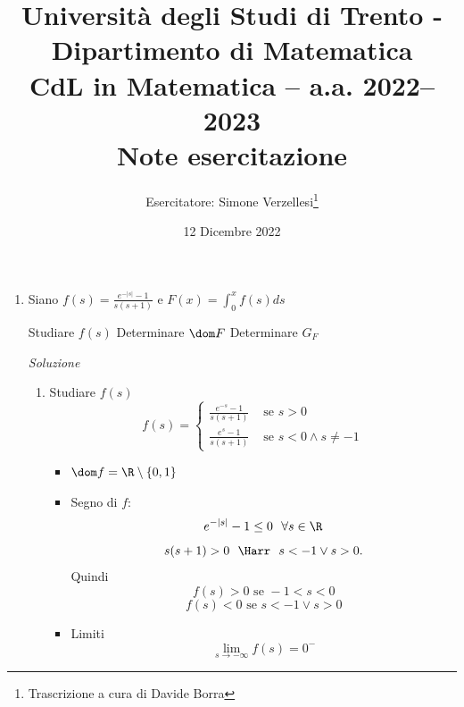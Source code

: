 \documentclass{article}
\title{Università degli Studi di Trento - Dipartimento di Matematica\\
CdL in Matematica – a.a. 2022–2023\\ Note esercitazione}
\author{Esercitatore: Simone Verzellesi\thanks{Trascrizione a cura di Davide Borra}}
\date{12 Dicembre 2022}
\newcommand{\se}{\text{ se }}
\begin{document}
\maketitle
{}
\setlength{\headheight}{30pt}
\begin{enumerate}[label=\textbf{Esercizio 12.\arabic*.},itemindent=*]
\item Siano $f(s)=\frac{e^{-|s|}-1}{s(s+1)}$ e $F(x)=\int_0^xf(s)ds$
\begin{tasks}
    \task Studiare $f(s)$
    \task Determinare $\dom F$
    \task Determinare $G_F$
\end{tasks}
\item[\textit{\large Soluzione~}]~
\begin{enumerate}
    \item Studiare $f(s)$
    \[f(s) = \begin{cases} \frac{e^{ - s} - 1}{s(s + 1)} &\se s > 0\\ \frac{e^{s} - 1}{s(s + 1)} &\se s < 0 \land s\neq - 1\end{cases} \]
    \begin{itemize}
        \item $\dom f=\R\setminus\{0,1\}$
        \item Segno di $f$:
        \[e^{-|s|}-1\leq 0~~\forall s\in \R\]
        \[s(s+1)>0~~\Harr~~s<-1\lor s>0.\]
        Quindi
        \[f(s)>0 \se -1<s<0\]
        \[f(s)<0 \se s <- 1 \lor s > 0\]
        \begin{figure}[h]
            \centering
        \end{figure}
        \item Limiti
        \[\lim_{s\to-\infty}f(s)=0^-\]

\end{itemize}
\end{enumerate}
\end{enumerate}
\end{document}
